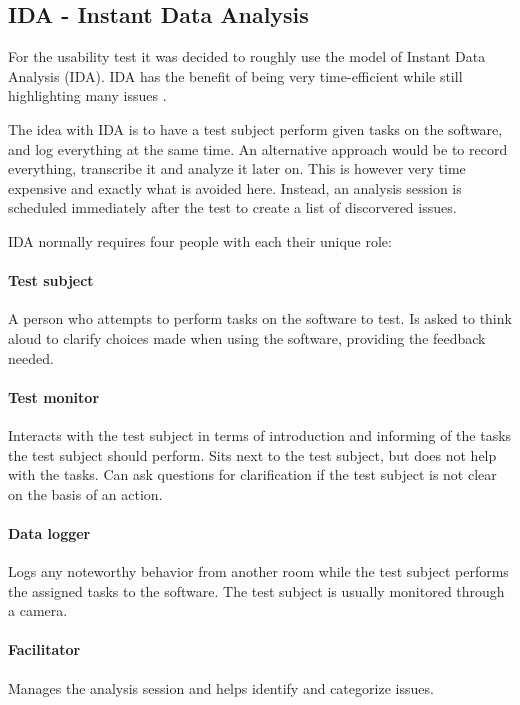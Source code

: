\subsection{IDA - Instant Data Analysis}\label{subsec:IDA}
For the usability test it was decided to roughly use the model of Instant Data Analysis (IDA). IDA has the benefit of being very time-efficient while still highlighting many issues \cite{IDA}.

The idea with IDA is to have a test subject perform given tasks on the software, and log everything at the same time. An alternative approach would be to record everything, transcribe it and analyze it later on. This is however very time expensive and exactly what is avoided here.
Instead, an analysis session is scheduled immediately after the test to create a list of discorvered issues.

IDA normally requires four people with each their unique role:

\paragraph{Test subject} A person who attempts to perform tasks on the software to test. Is asked to think aloud to clarify choices made when using the software, providing the feedback needed.

\paragraph{Test monitor} Interacts with the test subject in terms of introduction and informing of the tasks the test subject should perform. Sits next to the test subject, but does not help with the tasks. Can ask questions for clarification if the test subject is not clear on the basis of an action.

\paragraph{Data logger} Logs any noteworthy behavior from another room while the test subject performs the assigned tasks to the software. The test subject is usually monitored through a camera.

\paragraph{Facilitator} Manages the analysis session and helps identify and categorize issues.
